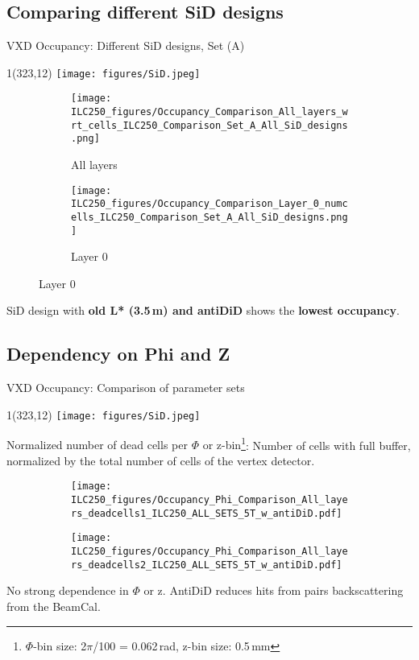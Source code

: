 \documentclass[xcolor={dvipsnames}]{beamer}
\newcommand{\sidlogo}{
  \setlength{\TPHorizModule}{1pt}
  \setlength{\TPVertModule}{1pt}
  \begin{textblock}{1}(323,12)
   \texttt{[image: figures/SiD.jpeg]}
  \end{textblock}
  }
\begin{document}
\subsection{Comparing different SiD designs}
\begin{frame}{VXD Occupancy: Different SiD designs, Set (A)}
\sidlogo

\begin{figure}
\centering
\begin{subfigure}[t]{0.48\textwidth}
\centering
\texttt{[image: ILC250\_figures/Occupancy\_Comparison\_All\_layers\_wrt\_cells\_ILC250\_Comparison\_Set\_A\_All\_SiD\_designs.png]}
\caption{\alert{All layers}}
 \end{subfigure}
\hspace*{0.2cm}
\begin{subfigure}[t]{0.48\textwidth}
\centering
\texttt{[image: ILC250\_figures/Occupancy\_Comparison\_Layer\_0\_numcells\_ILC250\_Comparison\_Set\_A\_All\_SiD\_designs.png]}
\caption{\alert{Layer 0}}
\end{subfigure}
\end{figure}
\normalsize SiD design with \textbf{old L* (3.5\,m) and antiDiD} shows the \textbf{lowest occupancy}.
\end{frame}

\subsection{Dependency on Phi and Z}
\begin{frame}{VXD Occupancy: Comparison of parameter sets}
\sidlogo
\alert{Normalized number of dead cells per $\Phi$ or z-bin}\footnote{$\Phi$-bin size: 2$\pi$/100 = 0.062\,rad, z-bin size: 0.5\,mm}: Number of cells with full buffer, normalized by the total number of cells of the vertex detector.
\begin{figure}
\centering
\begin{subfigure}[t]{0.48\textwidth}
\centering
\texttt{[image: ILC250\_figures/Occupancy\_Phi\_Comparison\_All\_layers\_deadcells1\_ILC250\_ALL\_SETS\_5T\_w\_antiDiD.pdf]}
 \end{subfigure}
\hspace*{0.2cm}
\begin{subfigure}[t]{0.48\textwidth}
\centering
\texttt{[image: ILC250\_figures/Occupancy\_Phi\_Comparison\_All\_layers\_deadcells2\_ILC250\_ALL\_SETS\_5T\_w\_antiDiD.pdf]}
\end{subfigure}
\end{figure}
No strong dependence in $\Phi$ or z. AntiDiD reduces hits from pairs backscattering from the BeamCal.
\end{frame}
\end{document}
